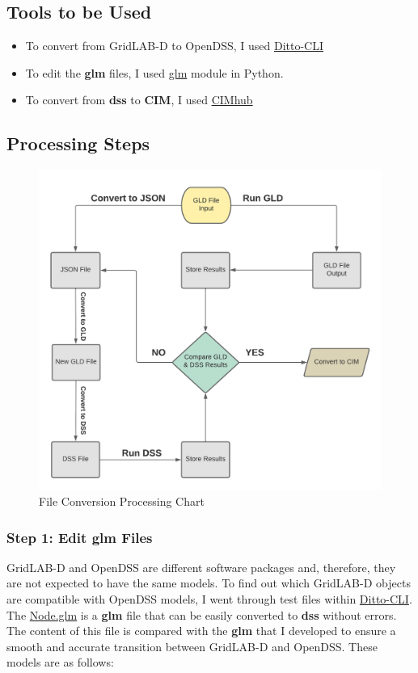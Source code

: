 \subsection{Tools to be Used}

\begin{itemize}
    \item To convert from GridLAB-D to OpenDSS, I used \href{https://github.com/NREL/ditto}{Ditto-CLI}
    \item To edit the \textbf{glm} files, I used \href{https://github.com/NREL/glm}{glm} module in Python.
    \item To convert from \textbf{dss} to \textbf{CIM}, I used \href{https://cimhub.readthedocs.io/en/latest/Tutorial.html#ieee-123-bus-base-case}{CIMhub}
\end{itemize}

\subsection{Processing Steps}

\begin{figure}[htp!]
    \centering
    \includegraphics[width=0.7\columnwidth]{Pictures/glm_conversion_tool.png}
    \caption{File Conversion Processing Chart}
    \label{fig:me_conversion}
\end{figure}

\subsubsection{Step 1: Edit \textbf{glm} Files}

GridLAB-D and OpenDSS are different software packages and, therefore, they are not expected to have the same models. To find out which GridLAB-D objects are compatible with OpenDSS models, I went through test files 
within \href{https://github.com/NREL/ditto}{Ditto-CLI}. The \href{run:/home/deras/Desktop/Midrar_work/ditto/tests/data/small_cases/gridlabd/ieee_4node/node.glm}{Node.glm} is a \textbf{glm} file that can be easily 
converted to \textbf{dss} without errors. The content of this file is compared with the \textbf{glm} that I developed to ensure a smooth and accurate transition between GridLAB-D and OpenDSS. These models are as follows:

